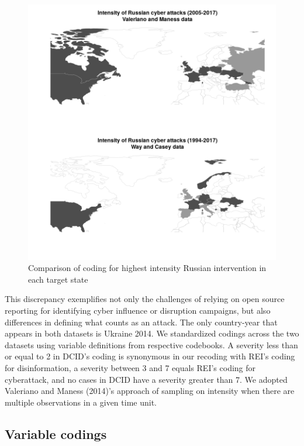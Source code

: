 \documentclass[
]{article}
\begin{document}
\begin{figure}[h!]

{\centering \includegraphics[width=1\linewidth,]{../paper/figures/map_prior-data} 

}

\caption{Comparison of coding for highest intensity Russian intervention in each target state}\label{fig:prior-data}
\end{figure}

This discrepancy exemplifies not only the challenges of relying on open source reporting for identifying cyber influence or disruption campaigns, but also differences in defining what counts as an attack. The only country-year that appears in both datasets is Ukraine 2014. We standardized codings across the two datasets using variable definitions from respective codebooks. A severity less than or equal to 2 in DCID's coding is synonymous in our recoding with REI's coding for disinformation, a severity between 3 and 7 equals REI's coding for cyberattack, and no cases in DCID have a severity greater than 7. We adopted Valeriano and Maness (2014)'s approach of sampling on intensity when there are multiple observations in a given time unit.

\hypertarget{variable-codings}{%
\subsection{Variable codings}\label{variable-codings}}
\end{document}
